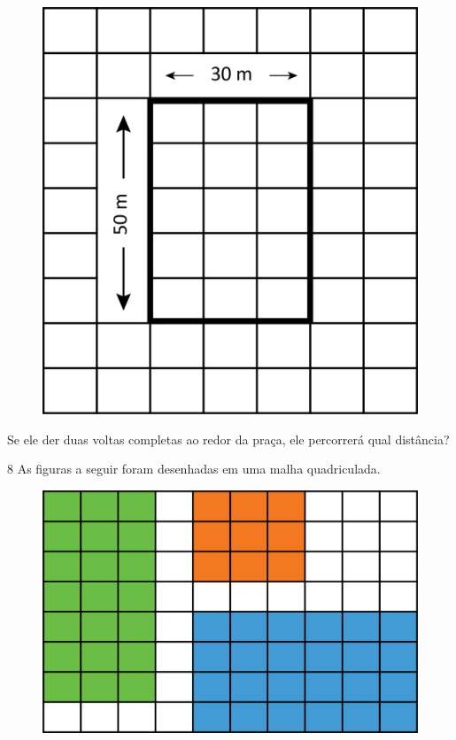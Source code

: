 \begin{figure}[htpb!]
\centering
\includegraphics[width=.8\textwidth]{./media/image55.png}
\end{figure}

Se ele der duas voltas completas ao redor da praça, ele percorrerá qual distância?




\pagebreak
\num{8} As figuras a seguir foram desenhadas em uma malha quadriculada.


\begin{figure}[htpb!]
\includegraphics[width=\textwidth]{./media/image56.png}
\end{figure}

